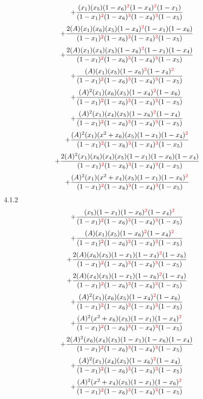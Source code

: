 \documentclass{article}
\begin{document}
\[+\frac{(x_1)(x_5)(1-x_6)^{\textcolor{red}{2}}(1-x_4)^{\textcolor{red}{2}}(1-x_1)}{(1-x_1)^{\textcolor{red}{2}}(1-x_6)^{\textcolor{red}{3}}(1-x_4)^{\textcolor{red}{3}}(1-x_5)}\]\[+\frac{2(A)(x_1)(x_6)(x_5)(1-x_4)^{\textcolor{red}{2}}(1-x_1)(1-x_6)}{(1-x_1)^{\textcolor{red}{2}}(1-x_6)^{\textcolor{red}{3}}(1-x_4)^{\textcolor{red}{3}}(1-x_5)}\]\[+\frac{2(A)(x_1)(x_4)(x_5)(1-x_6)^{\textcolor{red}{2}}(1-x_1)(1-x_4)}{(1-x_1)^{\textcolor{red}{2}}(1-x_6)^{\textcolor{red}{3}}(1-x_4)^{\textcolor{red}{3}}(1-x_5)}\]\[+\frac{(A)(x_1)(x_5)(1-x_6)^{\textcolor{red}{2}}(1-x_4)^{\textcolor{red}{2}}}{(1-x_1)^{\textcolor{red}{2}}(1-x_6)^{\textcolor{red}{3}}(1-x_4)^{\textcolor{red}{3}}(1-x_5)}\]\[+\frac{(A)^{2}(x_1)(x_6)(x_5)(1-x_4)^{\textcolor{red}{2}}(1-x_6)}{(1-x_1)^{\textcolor{red}{2}}(1-x_6)^{\textcolor{red}{3}}(1-x_4)^{\textcolor{red}{3}}(1-x_5)}\]\[+\frac{(A)^{2}(x_1)(x_4)(x_5)(1-x_6)^{\textcolor{red}{2}}(1-x_4)}{(1-x_1)^{\textcolor{red}{2}}(1-x_6)^{\textcolor{red}{3}}(1-x_4)^{\textcolor{red}{3}}(1-x_5)}\]\[+\frac{(A)^{2}(x_1)(x^{2}+x_6)(x_5)(1-x_1)(1-x_4)^{\textcolor{red}{2}}}{(1-x_1)^{\textcolor{red}{2}}(1-x_6)^{\textcolor{red}{3}}(1-x_4)^{\textcolor{red}{3}}(1-x_5)}\]\[+\frac{2(A)^{2}(x_1)(x_6)(x_4)(x_5)(1-x_1)(1-x_6)(1-x_4)}{(1-x_1)^{\textcolor{red}{2}}(1-x_6)^{\textcolor{red}{3}}(1-x_4)^{\textcolor{red}{3}}(1-x_5)}\]\[+\frac{(A)^{2}(x_1)(x^{2}+x_4)(x_5)(1-x_1)(1-x_6)^{\textcolor{red}{2}}}{(1-x_1)^{\textcolor{red}{2}}(1-x_6)^{\textcolor{red}{3}}(1-x_4)^{\textcolor{red}{3}}(1-x_5)}\]
4.1.2
\[+\frac{(x_5)(1-x_1)(1-x_6)^{\textcolor{red}{2}}(1-x_4)^{\textcolor{red}{2}}}{(1-x_1)^{\textcolor{red}{2}}(1-x_6)^{\textcolor{red}{3}}(1-x_4)^{\textcolor{red}{3}}(1-x_5)}\]\[+\frac{(A)(x_1)(x_5)(1-x_6)^{\textcolor{red}{2}}(1-x_4)^{\textcolor{red}{2}}}{(1-x_1)^{\textcolor{red}{2}}(1-x_6)^{\textcolor{red}{3}}(1-x_4)^{\textcolor{red}{3}}(1-x_5)}\]\[+\frac{2(A)(x_6)(x_5)(1-x_1)(1-x_4)^{\textcolor{red}{2}}(1-x_6)}{(1-x_1)^{\textcolor{red}{2}}(1-x_6)^{\textcolor{red}{3}}(1-x_4)^{\textcolor{red}{3}}(1-x_5)}\]\[+\frac{2(A)(x_4)(x_5)(1-x_1)(1-x_6)^{\textcolor{red}{2}}(1-x_4)}{(1-x_1)^{\textcolor{red}{2}}(1-x_6)^{\textcolor{red}{3}}(1-x_4)^{\textcolor{red}{3}}(1-x_5)}\]\[+\frac{(A)^{2}(x_1)(x_6)(x_5)(1-x_4)^{\textcolor{red}{2}}(1-x_6)}{(1-x_1)^{\textcolor{red}{2}}(1-x_6)^{\textcolor{red}{3}}(1-x_4)^{\textcolor{red}{3}}(1-x_5)}\]\[+\frac{(A)^{2}(x^{2}+x_6)(x_5)(1-x_1)(1-x_4)^{\textcolor{red}{2}}}{(1-x_1)^{\textcolor{red}{2}}(1-x_6)^{\textcolor{red}{3}}(1-x_4)^{\textcolor{red}{3}}(1-x_5)}\]\[+\frac{2(A)^{2}(x_6)(x_4)(x_5)(1-x_1)(1-x_6)(1-x_4)}{(1-x_1)^{\textcolor{red}{2}}(1-x_6)^{\textcolor{red}{3}}(1-x_4)^{\textcolor{red}{3}}(1-x_5)}\]\[+\frac{(A)^{2}(x_1)(x_4)(x_5)(1-x_6)^{\textcolor{red}{2}}(1-x_4)}{(1-x_1)^{\textcolor{red}{2}}(1-x_6)^{\textcolor{red}{3}}(1-x_4)^{\textcolor{red}{3}}(1-x_5)}\]\[+\frac{(A)^{2}(x^{2}+x_4)(x_5)(1-x_1)(1-x_6)^{\textcolor{red}{2}}}{(1-x_1)^{\textcolor{red}{2}}(1-x_6)^{\textcolor{red}{3}}(1-x_4)^{\textcolor{red}{3}}(1-x_5)}\]
\end{document}

